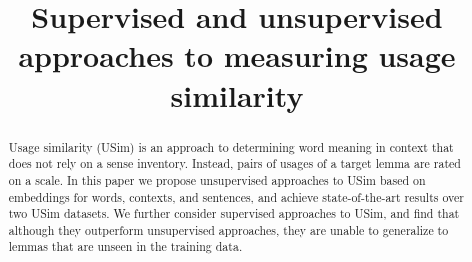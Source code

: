 \documentclass[11pt]{article}
\title{Supervised and unsupervised approaches to measuring usage similarity}
\author{}
\date{}
\begin{document}
\maketitle

\begin{abstract}
Usage similarity (USim) is an approach to determining word meaning in
context that does not rely on a sense inventory. Instead, pairs of
usages of a target lemma are rated on a scale. In this paper we
propose unsupervised approaches to USim based on embeddings for words,
contexts, and sentences, and achieve state-of-the-art results over two
USim datasets. We further consider supervised approaches to USim, and
find that although they outperform unsupervised approaches, they are
unable to generalize to lemmas that are unseen in the training data.
\end{abstract}






\end{document}
